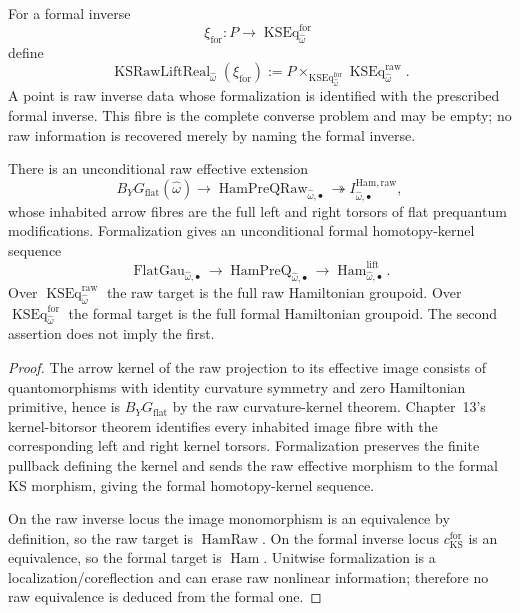 \begin{definition}
\label{def:prequantum-raw-liftability-recovery-fibre}
For a formal inverse
\[
\xi_{\mathrm{for}}:
P\longrightarrow\operatorname{KSEq}^{\mathrm{for}}_{\widehat\omega}
\]
define
\[
\boxed{
\operatorname{KSRawLiftReal}_{\widehat\omega}(\xi_{\mathrm{for}})
:=
P\times_{\operatorname{KSEq}^{\mathrm{for}}_{\widehat\omega}}
\operatorname{KSEq}^{\mathrm{raw}}_{\widehat\omega}.
}
\]
A point is raw inverse data whose formalization is identified with the prescribed
formal inverse.  This fibre is the complete converse problem and may be empty;
no raw information is recovered merely by naming the formal inverse.
\end{definition}

\begin{theorem}
\label{thm:prequantum-integrated-kostant-souriau-extension}
There is an unconditional raw effective extension
\[
\boxed{
B_YG_{\mathrm{flat}}(\widehat\omega)
\longrightarrow
\operatorname{HamPreQRaw}_{\widehat\omega,\bullet}
\twoheadrightarrow
I^{\mathrm{Ham,raw}}_{\widehat\omega,\bullet},
}
\]
whose inhabited arrow fibres are the full left and right torsors of flat
prequantum modifications.  Formalization gives an unconditional formal
homotopy-kernel sequence
\[
\boxed{
\operatorname{FlatGau}_{\widehat\omega,\bullet}
\longrightarrow
\operatorname{HamPreQ}_{\widehat\omega,\bullet}
\longrightarrow
\operatorname{Ham}^{\mathrm{lift}}_{\widehat\omega,\bullet}.
}
\]
Over $\operatorname{KSEq}^{\mathrm{raw}}_{\widehat\omega}$ the raw target is the
full raw Hamiltonian groupoid.  Over
$\operatorname{KSEq}^{\mathrm{for}}_{\widehat\omega}$ the formal target is the
full formal Hamiltonian groupoid.  The second assertion does not imply the first.
\end{theorem}

\begin{proof}
The arrow kernel of the raw projection to its effective image consists of
quantomorphisms with identity curvature symmetry and zero Hamiltonian primitive,
hence is $B_YG_{\mathrm{flat}}$ by the raw curvature-kernel theorem.  Chapter~13's
kernel-bitorsor theorem identifies every inhabited image fibre with the
corresponding left and right kernel torsors.  Formalization preserves the finite
pullback defining the kernel and sends the raw effective morphism to the formal
KS morphism, giving the formal homotopy-kernel sequence.

On the raw inverse locus the image monomorphism is an equivalence by definition,
so the raw target is $\operatorname{HamRaw}$.  On the formal inverse locus
$c_{\mathrm{KS}}^{\mathrm{for}}$ is an equivalence, so the formal target is
$\operatorname{Ham}$.  Unitwise formalization is a localization/coreflection and
can erase raw nonlinear information; therefore no raw equivalence is deduced from
the formal one.
\end{proof}

